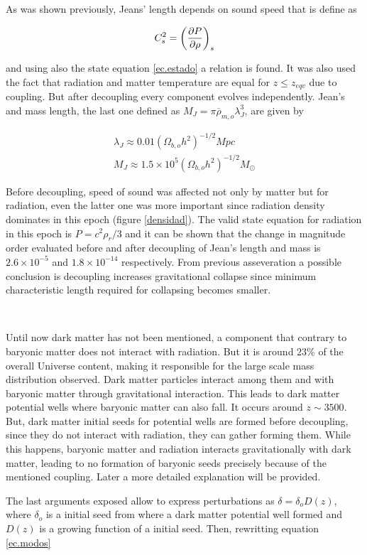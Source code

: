 As was shown previously, Jeans' length depends on sound speed 
that is define as 

\[
C_s^2 = \left( \frac{\partial P}{\partial \rho} \right)_s
\]

and using also the state equation \ref{ec.estado} a relation 
is found. It was also used the fact that radiation and matter 
temperature are equal for $z \leq z_{eqv}$ due to coupling. 
But after decoupling every component evolves independently. 
Jean's and mass length, the last one defined as $M_J =  \pi\overline{\rho}_{m,o}\lambda_J^3 $,
are given by

\begin{eqnarray}
\lambda_J \approx 0.01(\Omega_{b,o}h^2)^{-1/2}Mpc\\
M_J \approx 1.5\times 10^5 (\Omega_{b,o}h^2)^{-1/2}M_{\odot}
\end{eqnarray}

Before decoupling, speed of sound was affected not only 
by matter but for radiation, even the latter one was more
important since radiation density dominates in this epoch
(figure \ref{densidad}). 
The valid state equation for radiation in this epoch is
$P = c^2\rho_r/3$ and it can be shown that the change 
in magnitude order evaluated before and after decoupling
of Jean's length and mass is $2.6\times 10^{-5}$ and $1.8\times 10^{-14}$
respectively. From previous asseveration a possible conclusion is
decoupling increases gravitational collapse since  minimum characteristic length
required for collapsing becomes smaller. 

\

Until now dark matter has not been mentioned, a component that contrary
to baryonic matter does not interact with radiation. But it is around
$23\%$ of the overall Universe content, making it responsible for the 
large scale mass distribution observed. Dark matter particles interact
among them and with baryonic matter through gravitational interaction.
This leads to dark matter potential wells where baryonic matter can also fall.  
It occurs around $z \sim 3500$. But, dark matter initial seeds for potential 
wells are formed before decoupling, since they do not interact with radiation,
they can gather forming them. While this happens, baryonic matter and radiation 
interacts gravitationally with dark matter, leading to no formation of 
baryonic seeds precisely because of the mentioned coupling. Later a more detailed 
explanation will be provided. 

The last arguments exposed allow to express perturbations as $\delta = \delta_oD(z)$,
where $\delta_o$ is a initial seed from where a dark matter potential well formed
and $D(z)$ is a growing function of a initial seed.
Then, rewritting equation \ref{ec.modos}  

